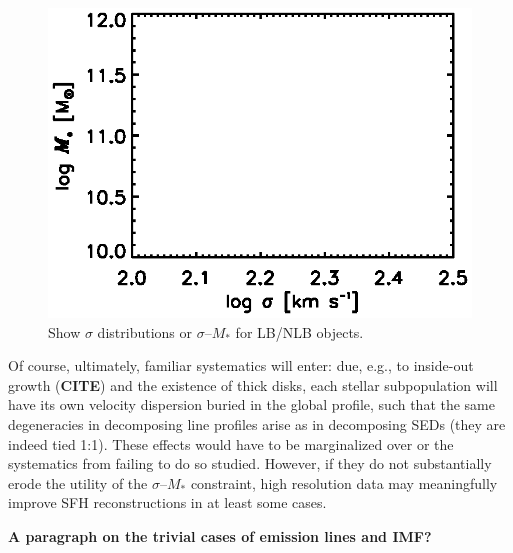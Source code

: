 \documentclass[a4paper,fleqn,usenatbib]{mnras}
\newcommand{\Mstel}{M_\ast}
\newcommand{\bfr}{\bf\color{red}}
\newcommand{\bfb}{\color{myblue}}
\newcommand{\CITE}{{\bfr CITE}}
\begin{document}
\begin{figure}
\centering
\includegraphics[scale = 0.9, trim = 1cm 0cm 0cm 0cm]{disp}
\caption{\bfb Show $\sigma$ distributions or $\sigma$--$\Mstel$ for LB/NLB objects.}
\label{fig:disp}
\end{figure}

Of course, ultimately, familiar systematics will enter: due, e.g., to inside-out growth (\CITE) 
and the existence of thick disks, each stellar subpopulation will have its own velocity 
dispersion buried in the global profile, such that the same degeneracies in decomposing 
line profiles arise as in decomposing SEDs (they are indeed tied 1:1). These 
effects would have to be marginalized over or the systematics from failing to do so studied.
However, if they do not substantially erode the utility of the $\sigma$--$\Mstel$ constraint,
high resolution data may meaningfully improve SFH reconstructions in at least some cases. 


{\bfr A paragraph on the trivial cases of emission lines and IMF?}
\end{document}
